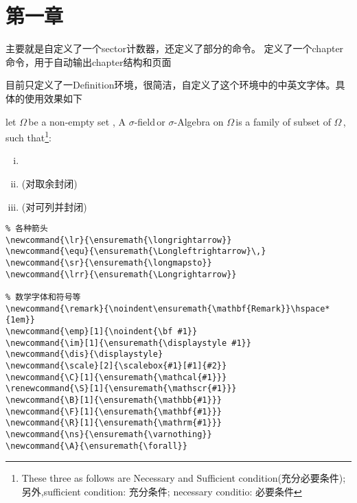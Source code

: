 \documentclass[12pt]{article}
\newcommand{\om}{\ensuremath{\Omega}\,}
\newcommand{\f}{\ensuremath{\sigma}-field\,}
\begin{document}

\chapter{第一章}

主要就是自定义了一个sector计数器，还定义了部分的命令。
定义了一个chapter命令，用于自动输出chapter结构和页面

目前只定义了一Definition环境，很简洁，自定义了这个环境中的中英文字体。具体的使用效果如下

\begin{Definition}
let \om be a non-empty set , A \f or  $\sigma$-Algebra  on \om is a family
of subset of \om, such that\footnote[1]{These three as follows are Necessary and Sufficient condition(充分必要条件); 
另外,sufficient condition: 充分条件; necessary conditio: 必要条件}: 
\begin{enumerate}[(i)]
    \item {}
    \item {}\mbox{(对取余封闭)}
    \item {}\mbox{(对可列并封闭)}
\end{enumerate} 
\end{Definition}

\begin{verbatim}
% 各种箭头
\newcommand{\lr}{\ensuremath{\longrightarrow}}
\newcommand{\equ}{\ensuremath{\Longleftrightarrow}\,}
\newcommand{\sr}{\ensuremath{\longmapsto}}
\newcommand{\lrr}{\ensuremath{\Longrightarrow}}

% 数学字体和符号等
\newcommand{\remark}{\noindent\ensuremath{\mathbf{Remark}}\hspace*{1em}}
\newcommand{\emp}[1]{\noindent{\bf #1}}
\newcommand{\im}[1]{\ensuremath{\displaystyle #1}}
\newcommand{\dis}{\displaystyle}
\newcommand{\scale}[2]{\scalebox{#1}[#1]{#2}}
\newcommand{\C}[1]{\ensuremath{\mathcal{#1}}}
\renewcommand{\S}[1]{\ensuremath{\mathscr{#1}}}
\newcommand{\B}[1]{\ensuremath{\mathbb{#1}}}
\newcommand{\F}[1]{\ensuremath{\mathbf{#1}}}
\newcommand{\R}[1]{\ensuremath{\mathrm{#1}}}
\newcommand{\ns}{\ensuremath{\varnothing}}
\newcommand{\A}{\ensuremath{\forall}}
\end{verbatim}
\end{document}
